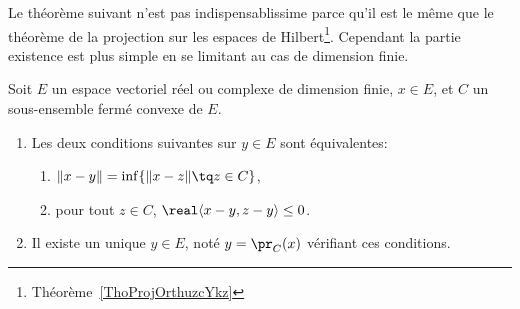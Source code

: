 Le théorème suivant n'est pas indispensablissime parce qu'il est le même que le théorème de la projection sur les espaces de Hilbert\footnote{Théorème~\ref{ThoProjOrthuzcYkz}}. Cependant la partie existence est plus simple en se limitant au cas de dimension finie.
\begin{theoremDef}  \label{ThoWKwosrH}
    Soit \( E\) un espace vectoriel réel ou complexe de dimension finie, \( x\in E\), et \( C\) un sous-ensemble fermé convexe de \(E\).
    \begin{enumerate}
        \item
            Les deux conditions suivantes sur \( y\in E\) sont équivalentes:
    \begin{enumerate}
        \item   \label{zzETsfYCSItemi}
            \( \| x-y \|=\inf\{ \| x-z \|\tq z\in C \}\),
        \item\label{zzETsfYCSItemii}
            pour tout \( z\in C\), \( \real\langle x-y, z-y\rangle \leq 0\).
    \end{enumerate}
\item
    Il existe un unique \( y\in E\), noté \( y=\pr_C(x)\) vérifiant ces conditions.
    \end{enumerate}
\end{theoremDef}

